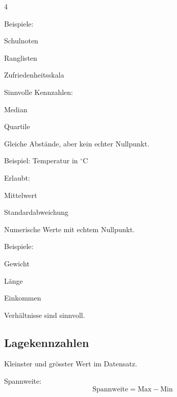 \begin{landscape}
\begin{multicols*}{4}
\begin{cheatSheetBox}[title=Ordinalskala]
Beispiele:

\begin{enumerate*}
\item Schulnoten
\item Ranglisten
\item Zufriedenheitsskala
\end{enumerate*}

Sinnvolle Kennzahlen:

\begin{enumerate*}
\item Median
\item Quartile
\end{enumerate*}
\end{cheatSheetBox}

\begin{cheatSheetBox}[title=Intervallskala]
Gleiche Abstände, aber kein echter Nullpunkt.

Beispiel: Temperatur in $^{\circ}$C

Erlaubt:

\begin{enumerate*}
\item Mittelwert
\item Standardabweichung
\end{enumerate*}
\end{cheatSheetBox}

\begin{cheatSheetBox}[title=Verhältnisskala]
Numerische Werte mit echtem Nullpunkt.

Beispiele:

\begin{enumerate*}
\item Gewicht
\item Länge
\item Einkommen
\end{enumerate*}

Verhältnisse sind sinnvoll.
\end{cheatSheetBox}

\textcolor{\cheatSheetColor}{\subsection*{Lagekennzahlen}}

\begin{cheatSheetBox}[title=Minimum und Maximum]
Kleinster und grösster Wert im Datensatz.

Spannweite:
\[
\text{Spannweite} = \text{Max} - \text{Min}
\]
\end{cheatSheetBox}


\end{multicols*}
\end{landscape}
